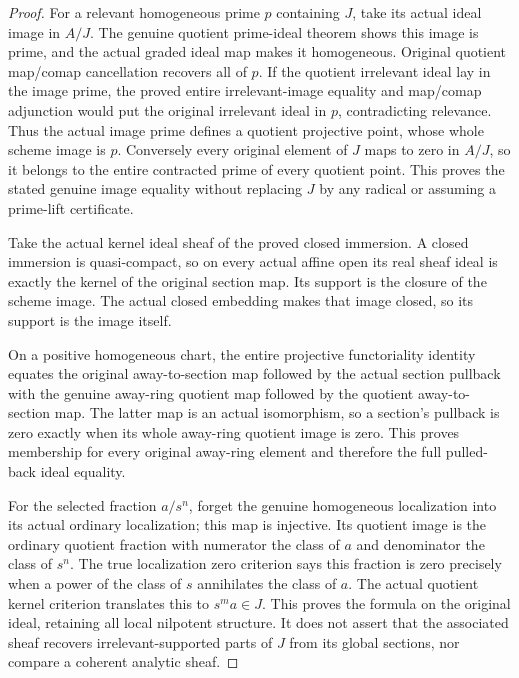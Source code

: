 \begin{proof}
For a relevant homogeneous prime $p$ containing $J$, take its actual
ideal image in $A/J$. The genuine quotient prime-ideal theorem shows
this image is prime, and the actual graded ideal map makes it homogeneous.
Original quotient map/comap cancellation recovers all of $p$. If the
quotient irrelevant ideal lay in the image prime, the proved entire
irrelevant-image equality and map/comap adjunction would put the original
irrelevant ideal in $p$, contradicting relevance. Thus the actual image
prime defines a quotient projective point, whose whole scheme image is
$p$. Conversely every original element of $J$ maps to zero in $A/J$, so
it belongs to the entire contracted prime of every quotient point. This
proves the stated genuine image equality without replacing $J$ by any
radical or assuming a prime-lift certificate.

Take the actual kernel ideal sheaf of the proved closed immersion.
A closed immersion is quasi-compact, so on every actual affine open
its real sheaf ideal is exactly the kernel of the original section map.
Its support is the closure of the scheme image. The actual closed
embedding makes that image closed, so its support is the image itself.

On a positive homogeneous chart, the entire projective functoriality
identity equates the original away-to-section map followed by the actual
section pullback with the genuine away-ring quotient map followed by the
quotient away-to-section map. The latter map is an actual isomorphism,
so a section's pullback is zero exactly when its whole away-ring quotient
image is zero. This proves membership for every original away-ring
element and therefore the full pulled-back ideal equality.

For the selected fraction $a/s^n$, forget the genuine homogeneous
localization into its actual ordinary localization; this map is injective.
Its quotient image is the ordinary quotient fraction with numerator the
class of $a$ and denominator the class of $s^n$. The true localization
zero criterion says this fraction is zero precisely when a power of the
class of $s$ annihilates the class of $a$. The actual quotient kernel
criterion translates this to $s^m a\in J$. This proves the formula on
the original ideal, retaining all local nilpotent structure. It does not
assert that the associated sheaf recovers irrelevant-supported parts of
$J$ from its global sections, nor compare a coherent analytic sheaf.
\end{proof}
